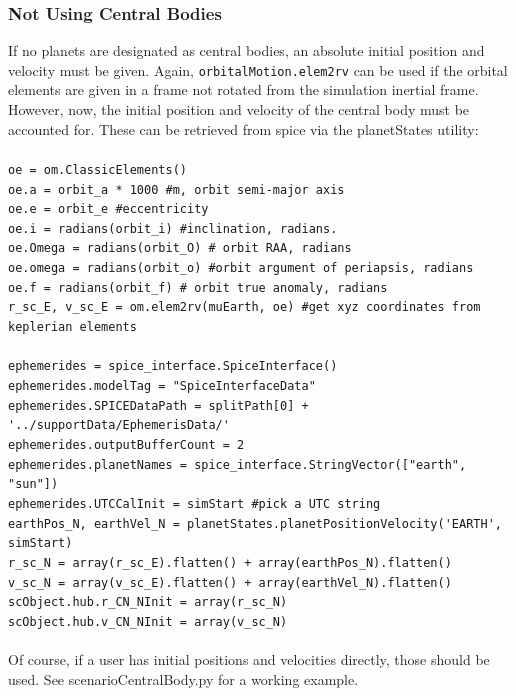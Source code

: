 \subsubsection{Not Using Central Bodies}
If no planets are designated as central bodies, an absolute initial position and velocity must be given. Again, \verb|orbitalMotion.elem2rv| can be used if the orbital elements are given in a frame not rotated from the simulation inertial frame. However, now, the initial position and velocity of the central body must be accounted for. These can be retrieved from spice via the planetStates utility:\\\\
\verb|oe = om.ClassicElements()|\\
\verb|oe.a = orbit_a * 1000 #m, orbit semi-major axis|\\
\verb|oe.e = orbit_e #eccentricity|\\
\verb|oe.i = radians(orbit_i) #inclination, radians.|\\
\verb|oe.Omega = radians(orbit_O) # orbit RAA, radians|\\
\verb|oe.omega = radians(orbit_o) #orbit argument of periapsis, radians|\\
\verb|oe.f = radians(orbit_f) # orbit true anomaly, radians|\\
\verb|r_sc_E, v_sc_E = om.elem2rv(muEarth, oe) #get xyz coordinates from keplerian elements|\\\\
\verb|ephemerides = spice_interface.SpiceInterface()|\\
\verb|ephemerides.modelTag = "SpiceInterfaceData"|\\
\verb|ephemerides.SPICEDataPath = splitPath[0] + '../supportData/EphemerisData/'|\\
\verb|ephemerides.outputBufferCount = 2|\\
\verb|ephemerides.planetNames = spice_interface.StringVector(["earth", "sun"])|\\
\verb|ephemerides.UTCCalInit = simStart #pick a UTC string|\\
\verb|earthPos_N, earthVel_N = planetStates.planetPositionVelocity('EARTH', simStart)|\\
\verb|r_sc_N = array(r_sc_E).flatten() + array(earthPos_N).flatten()|\\
\verb|v_sc_N = array(v_sc_E).flatten() + array(earthVel_N).flatten()|\\
\verb|scObject.hub.r_CN_NInit = array(r_sc_N)|\\
\verb|scObject.hub.v_CN_NInit = array(v_sc_N)|\\\\
Of course, if a user has initial positions and velocities directly, those should be used. See scenarioCentralBody.py for a working example.\\

